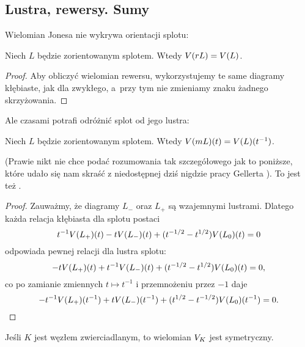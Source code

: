 
\subsection{Lustra, rewersy. Sumy}
Wielomian Jonesa nie wykrywa orientacji splotu:

\begin{proposition}
%
    Niech $L$ będzie zorientowanym splotem.
    Wtedy $V(rL)=V(L)$.
\end{proposition}

\begin{proof}
    Aby obliczyć wielomian rewersu, wykorzystujemy te same diagramy kłębiaste,
    jak dla zwykłego, a~przy tym nie zmieniamy znaku żadnego skrzyżowania.
\end{proof}

Ale czasami potrafi odróżnić splot od jego lustra:

\begin{proposition}
%
    Niech $L$ będzie zorientowanym splotem.
    Wtedy $V(mL)(t)=V(L)(t^{-1})$.
\end{proposition}

(Prawie nikt nie chce podać rozumowania tak szczegółowego jak to poniższe, które udało się nam skraść z niedostępnej dziś nigdzie pracy Gellerta \cite[s. 12]{gellert09}).
To jest też \cite[fakt 10.4.4]{kawauchi96}.

\begin{proof}
    Zauważmy, że diagramy $L_-$ oraz $L_+$ są wzajemnymi lustrami.
    Dlatego każda relacja kłębiasta dla splotu postaci
    \begin{equation}
        t^{-1} V(L_+)(t) - tV(L_-)(t) + (t^{-1/2} - t^{1/2}) V(L_0)(t) = 0
    \end{equation}
    odpowiada pewnej relacji dla lustra splotu:
    \begin{equation}
        -tV(L_+)(t) + t^{-1} V(L_-)(t) + (t^{-1/2} - t^{1/2}) V(L_0)(t) = 0,
    \end{equation}
    co po zamianie zmiennych $t \mapsto t^{-1}$ i przemnożeniu przez $-1$ daje
    \begin{equation}
        -t^{-1} V(L_+)(t^{-1}) + t V(L_-)(t^{-1}) + (t^{1/2} - t^{-1/2}) V(L_0)(t^{-1}) = 0.
    \end{equation}
\end{proof}

\begin{corollary}
%
\label{cor:jones_of_amphicheiral}%
    Jeśli $K$ jest węzłem zwierciadlanym, to wielomian $V_K$ jest symetryczny.
\end{corollary}

